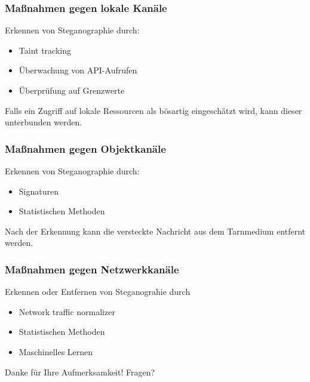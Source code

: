 \documentclass{beamer}
\begin{document}
\begin{frame}
  \frametitle{Maßnahmen gegen lokale Kanäle}
  Erkennen von Steganographie durch:
  \begin{itemize}
    \item Taint tracking
    \item Überwachung von API-Aufrufen
    \item Überprüfung auf Grenzwerte
  \end{itemize}
  Falls ein Zugriff auf lokale Ressourcen als bösartig eingeschätzt wird, kann dieser unterbunden werden.
\end{frame}

\begin{frame}
  \frametitle{Maßnahmen gegen Objektkanäle}
  Erkennen von Steganographie durch:
  \begin{itemize}
    \item Signaturen
    \item Statistischen Methoden
  \end{itemize}
  Nach der Erkennung kann die versteckte Nachricht aus dem Tarnmedium entfernt werden.
\end{frame}

\begin{frame}
  \frametitle{Maßnahmen gegen Netzwerkkanäle}
  Erkennen oder Entfernen von Steganograhie durch
  \begin{itemize}
    \item Network traffic normalizer
    \item Statistischen Methoden
    \item Maschinelles Lernen
  \end{itemize}
\end{frame}

%    
  
\begin{frame}
	\centering Danke für Ihre Aufmerksamkeit!
	\centering Fragen?
\end{frame}
\end{document}
